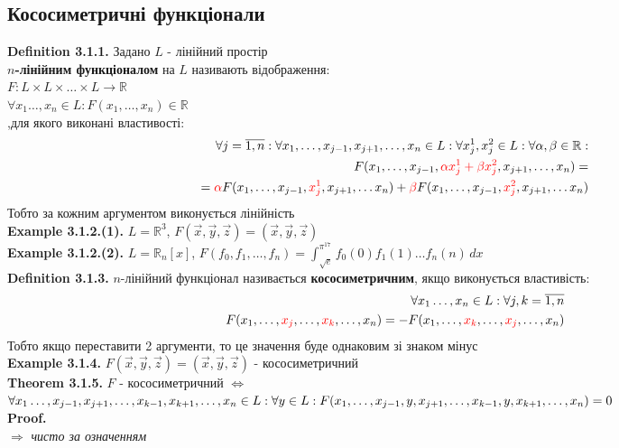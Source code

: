 \documentclass[a4paper, 14pt]{extarticle}
\def\defin#1{\textbf{Definition {#1}}}
\def\ex#1{\textbf{Example {#1}}}
\def\th#1{\textbf{Theorem {#1}}}
\def\proof{\textbf{Proof.}\\}
\def\bigline{\vspace{5mm}\\}
\begin{document}
	
	\subsection{Кососиметричні функціонали}
	\defin{3.1.1.} Задано $L$ - лінійний простір\\
	\textbf{$n$-лінійним функціоналом} на $L$ називають відображення:\\
	$F: L \times L \times \dots \times L \to \mathbb{R}$\\
	$\forall x_1 \dots, x_n \in L: F(x_1, \dots, x_n) \in \mathbb{R}$\\
	,для якого виконані властивості:
	\begin{align*}
	\forall j = \overline{1,n}: \forall x_1,\dots,x_{j-1}, x_{j+1}, \dots, x_n \in L: \forall x_j^1, x_j^2 \in L: \forall \alpha, \beta \in \mathbb{R}:\\
	F(x_1,\dots,x_{j-1}, \textcolor{red}{\alpha x_j^1 + \beta x_j^2}, x_{j+1}, \dots, x_n) = \\ = \textcolor{red}{\alpha} F(x_1, \dots, x_{j-1}, \textcolor{red}{x_j^1}, x_{j+1}, \dots x_n) + \textcolor{red}{\beta} F(x_1, \dots, x_{j-1}, \textcolor{red}{x_j^2}, x_{j+1}, \dots x_n)
	\end{align*}
	Тобто за кожним аргументом виконується лінійність
	\bigline
	\ex{3.1.2.(1).} $L = \mathbb{R}^3$, $F(\vec{x},\vec{y},\vec{z}) = (\vec{x}, \vec{y}, \vec{z})$\\
	\ex{3.1.2.(2).} $L = \mathbb{R}_n[x]$, $F(f_0,f_1,\dots,f_n) = \displaystyle \int_{\sqrt{e}}^{\pi^{17}} f_0(0)f_1(1)\dots f_n(n) \,dx$
	\bigline
	\defin{3.1.3.} $n$-лінійний функціонал називається \textbf{кососиметричним}, якщо виконується властивість:
	\begin{align*}
	\forall x_1 \dots, x_n \in L: \forall j,k = \overline{1,n}\\
	F(x_1, \dots, \textcolor{red}{x_j}, \dots, \textcolor{red}{x_k}, \dots, x_n) = -F(x_1, \dots, \textcolor{red}{x_k}, \dots, \textcolor{red}{x_j}, \dots, x_n)
	\end{align*}
	Тобто якщо переставити 2 аргументи, то це значення буде однаковим зі знаком мінус
	\bigline
	\ex{3.1.4.} $F(\vec{x},\vec{y},\vec{z}) = (\vec{x}, \vec{y}, \vec{z})$ - кососиметричний
	\bigline
	\th{3.1.5.} $F$ - кососиметричний $\iff$ $\forall x_1 \dots, x_{j-1}, x_{j+1}, \dots, x_{k-1}, x_{k+1}, \dots, x_{n} \\ \in L: \forall y \in L: F(x_1,\dots, x_{j-1}, y, x_{j+1}, \dots, x_{k-1}, y, x_{k+1}, \dots, x_n) = 0$\\
	\proof
	$\boxed{\Rightarrow}$ \textit{чисто за означенням}\bigline
\end{document}
